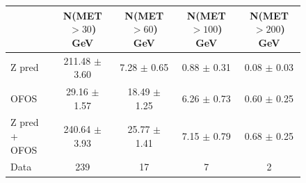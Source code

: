 \begin{figure}[hbtp]
  \begin{center}

	\medskip 

    \begin{tabular}{lcccc}
\hline
                        &   N(MET $>30$)  GeV    &   N(MET $>60$)  GeV    &   N(MET $>100$) GeV    &   N(MET $>200$) GeV \\
\hline
        Z pred  &  211.48  $\pm$  3.60  &    7.28  $\pm$  0.65  &    0.88  $\pm$  0.31  &    0.08  $\pm$  0.03 \\
          OFOS  &   29.16  $\pm$  1.57  &   18.49  $\pm$  1.25  &    6.26  $\pm$  0.73  &    0.60  $\pm$  0.25 \\
\hline
 Z pred + OFOS  &  240.64  $\pm$  3.93  &   25.77  $\pm$  1.41  &    7.15  $\pm$  0.79  &    0.68  $\pm$  0.25 \\
\hline
          Data  &                  239  &                   17  &                    7  &                    2 \\

\hline
    \end{tabular}

    \caption{ \resultcaption{$\mu\mu$} }
    \label{fig:pfmet_mm}
  \end{center}
\end{figure}



